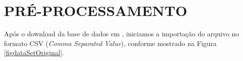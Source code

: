 \documentclass[
	12pt,				%
	openright,			%
	oneside,	
	a4paper,				%
	english,				%
	brazil				%
]{abntex2/abntex2} %
\begin{document}

	
	\section{PRÉ-PROCESSAMENTO}
	\label{Pré-processamento}
	
	Após o download da base de dados em \cite{fortaleza:2015},  iniciamos a importação do arquivo no formato CSV (\textit{Comma Separated Value}), conforme mostrado na Figura \ref{figdataSetOriginal}.
	
\end{document}
